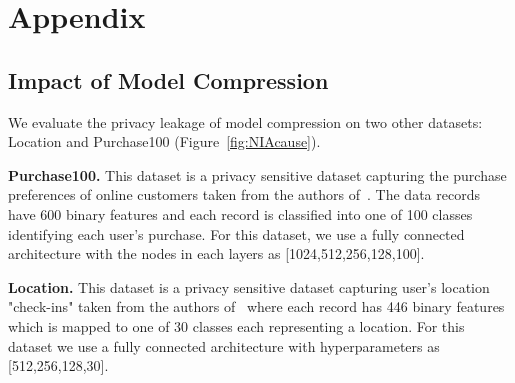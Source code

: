 \section*{Appendix}

\subsection{Impact of Model Compression}

We evaluate the privacy leakage of model compression on two other datasets: Location and Purchase100 (Figure~\ref{fig:NIAcause}).

\noindent\textbf{Purchase100.} This dataset is a privacy sensitive dataset capturing the purchase preferences of online customers taken from the authors of~\cite{shokri2017membership}.
The data records have 600 binary features and each record is classified into one of 100 classes identifying each user's purchase.
For this dataset, we use a fully connected architecture with the nodes in each layers as [1024,512,256,128,100].

\noindent\textbf{Location.} This dataset is a privacy sensitive dataset capturing user's location "check-ins" taken from the authors of~\cite{shokri2017membership} where each record has 446 binary features which is mapped to one of 30 classes each representing a location. For this dataset we use a fully connected architecture with hyperparameters as [512,256,128,30].

